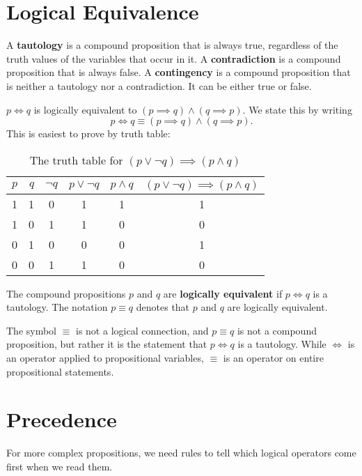 \section{Logical Equivalence}
  A \textbf{tautology} is a compound proposition that is always true, regardless of the truth values of the variables that occur in it.
  A \textbf{contradiction} is a compound proposition that is always false.
  A \textbf{contingency} is a compound proposition that is neither a tautology nor a contradiction.
  It can be either true or false.
\begin{ex}
    \( p \iff q \) is logically equivalent to \( (p \implies q) \wedge (q \implies p)\).
    We state this by writing
    \[ p \iff q \equiv (p \implies q) \wedge (q \implies p).\]
    This is easiest to prove by truth table:
\begin{table}[H]
  \centering
    \begin{tabular}{lrcccc}
      \toprule
      $p$ & $q$ & $\neg q$ & $p \lor \neg q$ & $p \land q$ & $(p \lor \neg q) \implies (p \land q)$ \\ \midrule
      1 & 1 & 0      & 1             & 1         & 1 \\
      1 & 0 & 1      & 1             & 0         & 0 \\
      0 & 1 & 0      & 0             & 0         & 1 \\
      0 & 0 & 1      & 1             & 0         & 0 \\
      \bottomrule
    \end{tabular}
  \caption{The truth table for $(p \lor \neg q) \implies (p \land q)$}
\end{table}
\end{ex}
The compound propositions \(p\) and \(q\) are \textbf{logically equivalent} if \(p \iff q\) is a tautology.
The notation \(p \equiv q\) denotes that \(p\) and \(q\) are logically equivalent.
\begin{remark}
  The symbol \(\equiv\) is not a logical connection, and \(p\equiv q\) is not a compound proposition, but rather it is the statement that \(p \iff q\) is a tautology. While $\iff$ is an operator applied to propositional variables, $\equiv$ is an operator on entire propositional statements.
\end{remark}

\section{Precedence}
For more complex propositions, we need rules to tell which logical operators come first when we read them.

